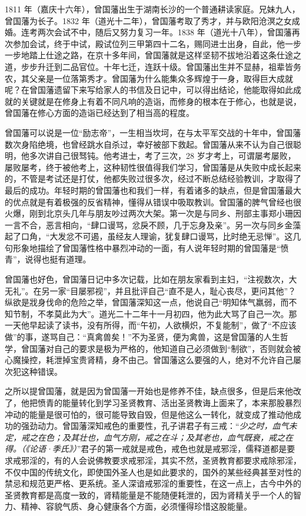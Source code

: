 1811 年（嘉庆十六年），曾国藩出生于湖南长沙的一个普通耕读家庭。兄妹九人，曾国藩为长子。1832 年（道光十二年），曾国藩考取了秀才，并与欧阳沧溟之女成婚。连考两次会试不中，随后又努力复习一年。1838 年（道光十八年），曾国藩再次参加会试，终于中试，殿试位列三甲第四十二名，赐同进士出身，自此，他一步一步地踏上仕途之路，在京十多年间，曾国藩就是这样坚韧不拔地沿着这条仕途之道，步步升迁到二品官位。十年七迁，连跃十级。曾国藩出生并不显赫，祖辈皆务农，其父亲是一位落第秀才。曾国藩为什么能集众多辉煌于一身，取得巨大成就呢？在曾国藩遗留下来写给家人的书信及日记中，可以得出结论，他能取得如此成就的关键就是在修身上有着不同凡响的造诣，而修身的根本在于修心，也就是说，曾国藩在修心方面的造诣已经达到了相当高的程度。

曾国藩可以说是一位“励志帝”，一生相当坎坷，在与太平军交战的十年中，曾国藩数次身陷绝境，也曾经跳水自杀过，幸好被部下救起。曾国藩从来不认为自己很聪明，他多次讲自己很驽钝。他考进士，考了三次，28 岁才考上，可谓屡考屡败，屡败屡考，终于被他考上，这种韧性很值得我们学习，曾国藩是从失败中成长起来的，不管是考试还是打仗，他都失败过很多次，经过不断总结经验教训，才取得了最后的成功。年轻时期的曾国藩也和我们一样，有着诸多的缺点，但是曾国藩最大的优点就是有着极强的反省精神，懂得从错误中吸取教训。曾国藩的脾气曾经也很火爆，刚到北京头几年与朋友吵过两次大架。第一次是与同乡、刑部主事郑小珊因一言不合，恶言相向，“肆口谩骂，忿戾不顾，几于忘身及亲”。另一次与同乡金藻起了口角，“大发忿不可遏，虽经友人理谕，犹复肆口谩骂，比时绝无忌惮”。这几句形象地描绘了曾国藩性格中暴烈冲动的一面，有人说年轻时期的曾国藩是“愤青”，说得也挺有道理。

曾国藩也好色，曾国藩日记中多次记载，比如在朋友家看到主妇，“注视数次，大无礼”。在另一家“目屡邪视”，并且批评自己“直不是人，耻心丧尽，更问其他”？纵欲是戕身伐命的危险之举，曾国藩深知这一点，他说自己“明知体气羸弱，而不知节制，不孝莫此为大”。道光二十二年十一月初四，他为此大骂了自己一次。那一天他早起读了读书，没有所得，而“午初，人欲横炽，不复能制”，做了“不应该做”的事，遂骂自己：“真禽兽矣！”不为圣贤，便为禽兽，这是曾国藩的人生哲学，曾国藩对自己的要求是极为严格的，他知道自己必须做到“制欲”，否则就会被心魔操控，耗泄掉宝贵肾精，身不由己。曾国藩这么要强的人，绝对不允许自己屡次犯这种错误。

之所以提曾国藩，就是因为曾国藩一开始也是修养不佳，缺点很多，但是后来他改了，他把愤青的能量转化到学习圣贤教育、活出圣贤教诲上面来了，本来那股暴烈冲动的能量是很可怕的，很可能导致自毁，但是他这么一转化，就变成了推动他成功的强劲动力。曾国藩深知戒色的重要性，孔子讲君子有三戒：“\textit{少之时，血气未定，戒之在色；及其壮也，血气方刚，戒之在斗；及其老也，血气既衰，戒之在得。（《论语·季氏》）}”君子的第一戒就是戒色，戒色也就是戒邪淫，儒释道都是要求戒邪淫的，有的人会说佛教要求戒邪淫，其实不然，圣贤教育都要求戒除邪淫，不仅中国的传统文化，即使国外圣人也是如此要求的，国外的某些经典甚至对性的禁忌和规范更严格、更系统。圣人深谙戒邪淫的重要性，在这一点上，古今中外的圣贤教育都是高度一致的，肾精能量是不能随便耗泄的，因为肾精关乎一个人的智力、精神、容貌气质、身心健康各个方面，必须懂得珍惜这股能量。


